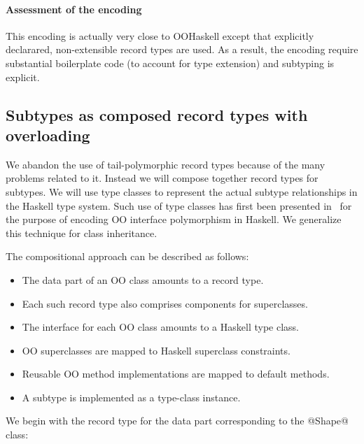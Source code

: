 \documentclass{jfp}
\begin{document}
\paragraph{Assessment of the encoding}

This encoding is actually very close to OOHaskell except that
explicitly declarared, non-extensible record types are used.  As a
result, the encoding require substantial boilerplate code (to account
for type extension) and subtyping is explicit.






\subsection{Subtypes as composed record types with overloading}
\label{S:objcomp}

We abandon the use of tail-polymorphic record types because of the
many problems related to it. Instead we will compose together record
types for subtypes. We will use type classes to represent the actual
subtype relationships in the Haskell type system. Such use of type
classes has first been presented in~\cite{SPJ01} for the purpose of
encoding OO interface polymorphism in Haskell. We generalize this
technique for class inheritance.

The compositional approach can be described as follows:
%
\begin{itemize}

\item The data part of an OO class amounts to a record type.
\item Each such record type also comprises components for superclasses.
\item The interface for each OO class amounts to a Haskell type class.
\item OO superclasses are mapped to Haskell superclass constraints.
\item Reusable OO method implementations are mapped to default methods.
\item A subtype is implemented as a type-class instance.

\end{itemize}

We begin with the record type for the data part corresponding to the
@Shape@ class:
\end{document}

